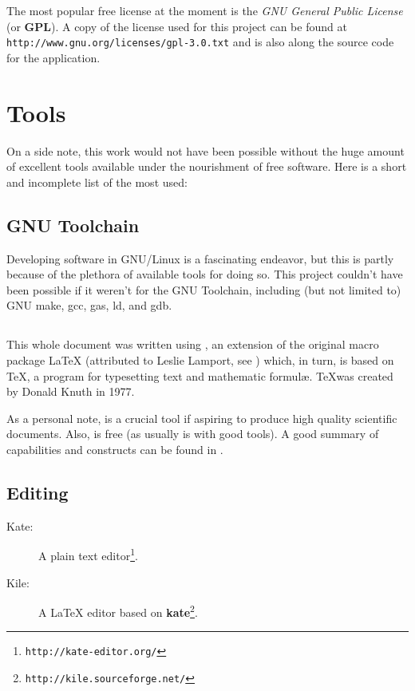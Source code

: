 \documentclass[a4paper,12pt,english]{report}
\begin{document}
The most popular free license at the moment is the \textit{GNU General Public License} (or \textbf{GPL}). A copy of the license used for this project can be found at \texttt{http://www.gnu.org/licenses/gpl-3.0.txt} and is also along the source code for the application.

\section{Tools}

On a side note, this work would not have been possible without the huge amount of excellent tools available under the nourishment of free software. Here is a short and incomplete list of the most used:

\subsection{GNU Toolchain}

Developing software in GNU/Linux is a fascinating endeavor, but this is partly because of the plethora of available tools for doing so. This project couldn't have been possible if it weren't for the GNU Toolchain, including (but not limited to) GNU make, gcc, gas, ld, and gdb.

\subsection{\LaTeXe}

This whole document was written using \LaTeXe, an extension of the original macro package \LaTeX {} (attributed to Leslie Lamport, see \cite{latex}) which, in turn, is based on \TeX, a program for typesetting text and mathematic formul\ae. \TeX was created by Donald Knuth in 1977\cite{texknuth}.

As a personal note, \LaTeXe {} is a crucial tool if aspiring to produce high quality scientific documents. Also, \LaTeXe is free (as usually is with good tools). A good summary of \LaTeXe capabilities and constructs can be found in \cite{tnssitl}.

\subsection{Editing}

\begin{description}
  \item [Kate:] A plain text editor\footnote{\texttt{http://kate-editor.org/}}.
  \item [Kile:] A \LaTeX {} editor based on  \textbf{kate}\footnote{\texttt{http://kile.sourceforge.net/}}.
\end{description}
\end{document}
